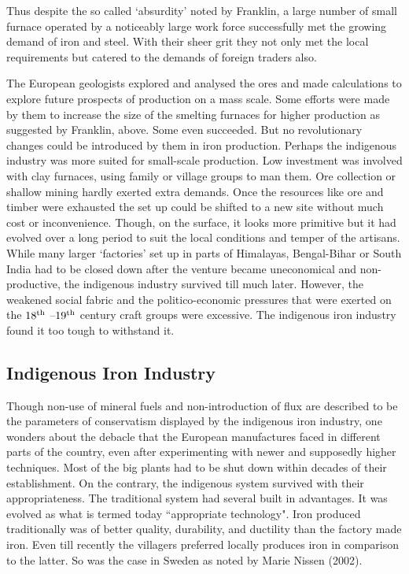 Thus despite the so called `absurdity' noted by Franklin, a large number of small furnace operated by a noticeably large work force successfully met the growing demand of iron and steel. With their sheer grit they not only met the local requirements but catered to the demands of foreign traders also.

The European geologists explored and analysed the ores and made calculations to explore future prospects of production on a mass scale. Some efforts were made by them to increase the size of the smelting furnaces for higher production as suggested by Franklin, above. Some even succeeded. But no revolutionary changes could be introduced by them in iron production. Perhaps the indigenous industry was more suited for small-scale production. Low investment was involved with clay furnaces, using family or village groups to man them. Ore collection or shallow mining hardly exerted extra demands. Once the resources like ore and timber were exhausted the set up could be shifted to a new site without much cost or inconvenience. Though, on the surface, it looks more primitive but it had evolved over a long period to suit the local conditions and temper of the artisans. While many larger ‘factories’ set up in parts of Himalayas, Bengal-Bihar or South India had to be closed down after the venture became uneconomical and non-productive, the indigenous industry survived till much later. However, the weakened social fabric and the politico-economic pressures that were exerted on the $18^{\rm th}$ –$19^{\rm th}$ century craft groups were excessive.  The indigenous iron industry found it too tough to withstand it. 

\vspace{-.3cm}

\subsection*{Indigenous Iron Industry}\label{chapter8-subsection-6}

\vspace{-.2cm}

Though non-use of mineral fuels and non-introduction of flux are described to be the parameters of conservatism displayed by the indigenous iron industry, one wonders about the debacle that the European manufactures faced in different parts of the country, even after experimenting with newer and supposedly higher techniques. Most of the big plants had to be shut down within decades of their establishment. On the contrary, the indigenous system survived with their appropriateness. The traditional system had several built in advantages. It was evolved as what is termed today ``appropriate technology". Iron produced traditionally was of better quality, durability, and ductility than the factory made iron. Even till recently the villagers preferred locally produces iron in comparison to the latter. So was the case in Sweden as noted by Marie Nissen (2002).

